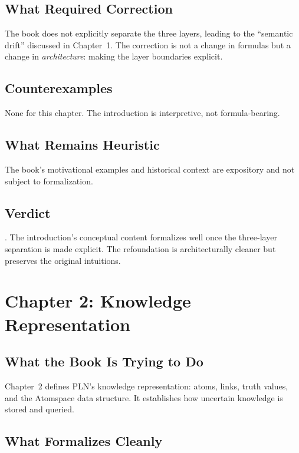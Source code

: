 \documentclass[11pt,openany]{report}
\begin{document}
\section{What Required Correction}

The book does not explicitly separate the three layers, leading to the
``semantic drift'' discussed in \xiPLN{} Chapter~1.  The correction is
not a change in formulas but a change in \emph{architecture}: making the
layer boundaries explicit.

\section{Counterexamples}

None for this chapter.  The introduction is interpretive, not
formula-bearing.

\section{What Remains Heuristic}

The book's motivational examples and historical context are expository
and not subject to formalization.

\section{Verdict}

\verdictClean{}.  The introduction's conceptual content formalizes well
once the three-layer separation is made explicit.  The refoundation is
architecturally cleaner but preserves the original intuitions.


\chapter{Chapter 2: Knowledge Representation}
\label{ch:review-ch2}

\section{What the Book Is Trying to Do}

Chapter~2 defines PLN's knowledge representation: atoms, links, truth
values, and the Atomspace data structure.  It establishes how uncertain
knowledge is stored and queried.

\section{What Formalizes Cleanly}
\end{document}

